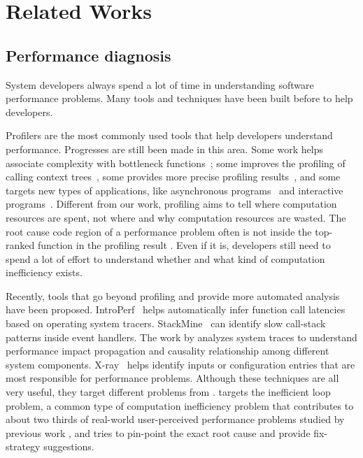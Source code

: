 \section{Related Works}
\label{sec:related}

\subsection{Performance diagnosis}
System developers always spend a lot of time in understanding software 
performance problems. Many tools and techniques have been built before to
help developers. 

Profilers are the most commonly used tools that help developers understand
performance.
Progresses are still been made in this area.
Some work helps associate complexity with bottleneck functions~\cite{Zaparanuks:2012:AP:2254064.2254074,Coppa:2012:IP:2254064.2254076};
some improves the profiling of calling context trees~\cite{D'Elia:2011:MHC:1993498.1993559}, 
some provides more precise profiling results~\cite{Mytkowicz:2010:EAJ:1806596.1806618}, and some targets new types of applications, 
like asynchronous programs~\cite{Ravindranath:2012:AMA:2387880.2387891} and 
interactive programs~\cite{Jovic:2011:CMY:2048066.2048081}.
Different from our work, profiling aims to tell where 
computation resources are spent, 
not where and why computation resources are wasted. 
The root cause code region of a performance problem often is not inside
the top-ranked function in the profiling result \cite{SongOOPSLA2014}.
Even if it is, developers still need to spend a lot of effort to understand
whether and what kind of computation inefficiency exists.

Recently, tools that go beyond profiling and provide more automated analysis
have been proposed.
IntroPerf~\cite{IntroPerf} helps automatically 
infer function call latencies based on
operating system tracers. StackMine~\cite{Han:2012:PDL:2337223.2337241} can
identify slow call-stack patterns inside event handlers. The work by
\citet{TaoAsplos2014} analyzes system traces to understand 
performance impact propagation and 
causality relationship among different system components. 
X-ray~\cite{Attariyan:2012:XAR:2387880.2387910} helps identify inputs
or configuration entries that are most responsible for performance problems.
Although these techniques are all very useful, 
they target different problems from \Tool. \Tool targets 
the inefficient loop problem, a common type of 
computation inefficiency problem that contributes to
about two thirds of real-world user-perceived performance problems studied
by previous work \cite{SongOOPSLA2014}, and tries to pin-point the exact
root cause and provide fix-strategy suggestions.

